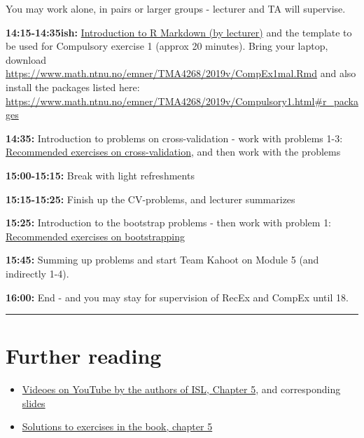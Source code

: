 \documentclass[]{article}
\providecommand{\tightlist}{%
  \setlength{\itemsep}{0pt}\setlength{\parskip}{0pt}}
\begin{document}
You may work alone, in pairs or larger groups - lecturer and TA will
supervise.

\textbf{14:15-14:35ish:}
\href{https://www.math.ntnu.no/emner/TMA4268/2019v/RMarkdownIntro.html}{Introduction
to R Markdown (by lecturer)} and the template to be used for Compulsory
exercise 1 (approx 20 minutes). Bring your laptop, download
\url{https://www.math.ntnu.no/emner/TMA4268/2019v/CompEx1mal.Rmd} and
also install the packages listed here:
\url{https://www.math.ntnu.no/emner/TMA4268/2019v/Compulsory1.html\#r_packages}

\textbf{14:35:} Introduction to problems on cross-validation - work with
problems 1-3: \protect\hyperlink{recexcv}{Recommended exercises on
cross-validation}, and then work with the problems

\textbf{15:00-15:15:} Break with light refreshments

\textbf{15:15-15:25:} Finish up the CV-problems, and lecturer summarizes

\textbf{15:25:} Introduction to the bootstrap problems - then work with
problem 1: \protect\hyperlink{recexboot}{Recommended exercises on
bootstrapping}

\textbf{15:45:} Summing up problems and start Team Kahoot on Module 5
(and indirectly 1-4).

\textbf{16:00:} End - and you may stay for supervision of RecEx and
CompEx until 18.

\begin{center}\rule{0.5\linewidth}{\linethickness}\end{center}

\hypertarget{further-reading}{%
\section{ Further reading }\label{further-reading}}

\begin{itemize}
\tightlist
\item
  \href{https://www.youtube.com/playlist?list=PL5-da3qGB5IA6E6ZNXu7dp89_uv8yocmf}{Videoes
  on YouTube by the authors of ISL, Chapter 5}, and corresponding
  \href{https://lagunita.stanford.edu/c4x/HumanitiesScience/StatLearning/asset/cv_boot.pdf}{slides}
\item
  \href{https://rstudio-pubs-static.s3.amazonaws.com/65561_43c0eaaa8565414eae333b47038f716c.html}{Solutions
  to exercises in the book, chapter 5}
\end{itemize}
\end{document}
